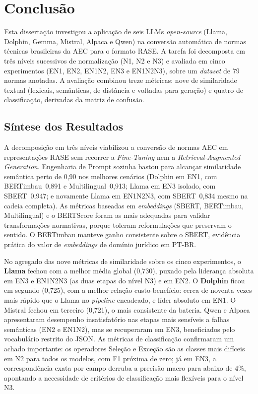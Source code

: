 \chapter{Conclusão}

Esta dissertação investigou a aplicação de seis LLMs \textit{open-source} (Llama, Dolphin, Gemma, Mistral, Alpaca e Qwen) na conversão automática de normas técnicas brasileiras da AEC para o formato RASE. A tarefa foi decomposta em três níveis sucessivos de normalização (N1, N2 e N3) e avaliada em cinco experimentos (EN1, EN2, EN1N2, EN3 e EN1N2N3), sobre um \textit{dataset} de 79 normas anotadas. A avaliação combinou treze métricas: nove de similaridade textual (lexicais, semânticas, de distância e voltadas para geração) e quatro de classificação, derivadas da matriz de confusão.

\section{Síntese dos Resultados}

A decomposição em três níveis viabilizou a conversão de normas AEC em representações RASE sem recorrer a \textit{Fine-Tuning} nem a \textit{Retrieval-Augmented Generation}. Engenharia de Prompt sozinha bastou para alcançar similaridade semântica perto de 0{,}90 nos melhores cenários (Dolphin em EN1, com BERTimbau~0{,}891 e Multilingual~0{,}913; Llama em EN3 isolado, com SBERT~0{,}947; e novamente Llama em EN1N2N3, com SBERT~0{,}834 mesmo na cadeia completa). As métricas baseadas em \textit{embeddings} (SBERT, BERTimbau, Multilingual) e o BERTScore foram as mais adequadas para validar transformações normativas, porque toleram reformulações que preservam o sentido. O BERTimbau manteve ganho consistente sobre o SBERT, evidência prática do valor de \textit{embeddings} de domínio jurídico em PT-BR.

No agregado das nove métricas de similaridade sobre os cinco experimentos, o \textbf{Llama} fechou com a melhor média global (0{,}730), puxado pela liderança absoluta em EN3 e EN1N2N3 (as duas etapas do nível N3) e em EN2. O \textbf{Dolphin} ficou em segundo (0{,}725), com a melhor relação custo-benefício: cerca de noventa vezes mais rápido que o Llama no \textit{pipeline} encadeado, e líder absoluto em EN1. O Mistral fechou em terceiro (0{,}721), o mais consistente da bateria. Qwen e Alpaca apresentaram desempenho insatisfatório nas etapas mais sensíveis a falhas semânticas (EN2 e EN1N2), mas se recuperaram em EN3, beneficiados pelo vocabulário restrito do JSON. As métricas de classificação confirmaram um achado importante: os operadores Seleção e Exceção são as classes mais difíceis em N2 para todos os modelos, com F1 próxima de zero; já em EN3, a correspondência exata por campo derruba a precisão macro para abaixo de 4\%, apontando a necessidade de critérios de classificação mais flexíveis para o nível N3.

